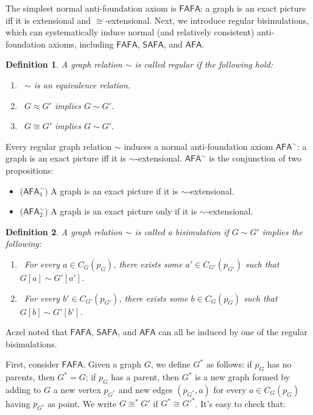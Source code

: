 \documentclass{amsart}
\newcommand{\FAFA}{\mathsf{FAFA}}
\newcommand{\SAFA}{\mathsf{SAFA}}
\newcommand{\AFA}{\mathsf{AFA}}
\newtheorem{definition}{Definition}
\begin{document}
The simplest normal anti-foundation axiom is $\FAFA$: a graph is an exact picture iff it is extensional and $\cong$-extensional. Next, we introduce regular bisimulations, which can systematically induce normal (and relatively consistent) anti-foundation axioms, including $\FAFA$, $\SAFA$, and $\AFA$.

\begin{definition}
    A graph relation $\sim$ is called regular if the following hold:
\begin{enumerate}[label=(\roman*)]
    \item\ $\sim$ is an equivalence relation.
    \item\ $G \approx G'$ implies $G \sim G'$.
    \item\ $G \cong G'$ implies $G \sim G'$.
\end{enumerate}
\end{definition}

Every regular graph relation $\sim$ induces a normal anti-foundation axiom $\AFA^\sim$: a graph is an exact picture iff it is $\sim$-extensional. $\AFA^\sim$ is the conjunction of two propositions:

\begin{itemize}
    \item ($\AFA_1^\sim$) A graph is an exact picture if it is $\sim$-extensional.
    \item ($\AFA_2^\sim$) A graph is an exact picture only if it is $\sim$-extensional.
\end{itemize}

\begin{definition}
    A graph relation $\sim$ is called a bisimulation if $G \sim G'$ implies the following:

\begin{enumerate}[label=(\roman*)]
    \item\ For every $a \in C_G(p_G)$, there exists some $a' \in C_{G'}(p_{G'})$ such that $G[a] \sim G'[a']$.
    \item\ For every $b' \in C_{G'}(p_{G'})$, there exists some $b \in C_G(p_G)$ such that $G[b] \sim G'[b']$.
\end{enumerate}
\end{definition}

Aczel noted that $\FAFA$, $\SAFA$, and $\AFA$ can all be induced by one of the regular bisimulations.\cite{Aczel}

First, consider $\FAFA$. Given a graph $G$, we define $G^*$ as follows: if $p_G$ has no parents, then $G^* = G$; if $p_G$ has a parent, then $G^*$ is a new graph formed by adding to $G$ a new vertex $p_{G^*}$ and new edges $(p_{G^*}, a)$ for every $a \in C_G(p_G)$ having $p_{G^*}$ as point. We write $G \cong^* G'$ if $G^* \cong {G'}^*$. It's easy to check that:
\end{document}
